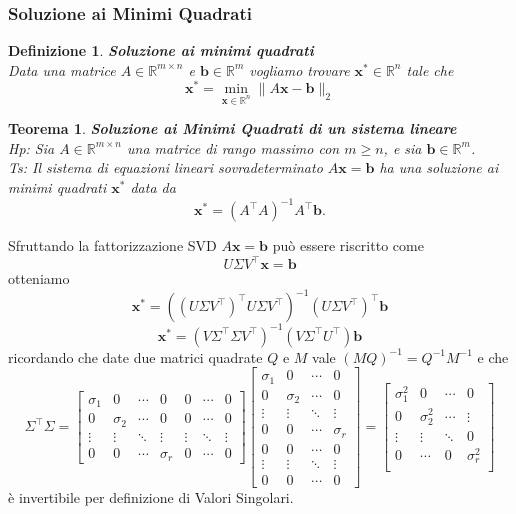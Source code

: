 \documentclass[11pt]{article}
\newtheorem{theorem}{Teorema}
\newtheorem{definition}{Definizione}
\newcommand{\R}{\mathbb{R}} %
\begin{document}
\subsubsection{Soluzione ai Minimi Quadrati}
\begin{definition}
\textbf{Soluzione ai minimi quadrati}\\
Data una matrice $A \in \R^{m \times n}$ e $ \mathbf{b} \in \R^m $  vogliamo trovare $\mathbf{x^*} \in \R^n$ tale che $$\mathbf{x^*} =	\min_{\mathbf{x} \in \R^{n}} \| A\mathbf{x} - \mathbf{b} \|_2 $$
\end{definition}
\begin{theorem}
\textbf{Soluzione ai Minimi Quadrati di un sistema lineare}\\
\textit{Hp:} Sia $A \in \mathbb{R}^{m \times n}$ una matrice di rango massimo con $m \geq n$, e sia $\mathbf{b} \in \mathbb{R}^m$.\\
\textit{Ts:} Il sistema di equazioni lineari sovradeterminato $A\mathbf{x} = \mathbf{b}$ ha una soluzione ai minimi quadrati $\mathbf{x}^*$ data da
\[
\mathbf{x}^* = (A^\top A)^{-1}A^\top \mathbf{b}.
\]
\end{theorem} \noindent 
Sfruttando la fattorizzazione SVD $A\mathbf{x} = \mathbf{b}$ può essere riscritto come
\[
U  \Sigma  V ^\top \mathbf{x} = \mathbf{b}
\]
otteniamo
\[
\mathbf{x}^* = ((U  \Sigma  V^\top )^\top U \Sigma V^\top)^{-1}(U \Sigma  V^\top )^\top \mathbf{b}
\]
\[
\mathbf{x}^* = ( V \Sigma^\top \Sigma V^\top)^{-1}(V \Sigma^\top U^\top)\mathbf{b}
\]
ricordando che date due matrici quadrate $Q$ e $M$ vale $(MQ)^{-1} = Q^{-1}M^{-1}$ e che 
$$
\Sigma^\top \Sigma = 
\begin{bmatrix}
\sigma_1 & 0 & \cdots & 0 & 0 & \cdots & 0 \\
0 & \sigma_2 & \cdots & 0 & 0 & \cdots & 0 \\
\vdots & \vdots & \ddots & \vdots & \vdots & \ddots & \vdots \\
0 & 0 & \cdots & \sigma_r & 0 & \cdots & 0
\end{bmatrix}
\begin{bmatrix}
\sigma_1 & 0 & \cdots & 0 \\
0 & \sigma_2 & \cdots & 0 \\
\vdots & \vdots & \ddots & \vdots \\
0 & 0 & \cdots & \sigma_r \\
0 & 0 & \cdots & 0 \\
\vdots & \vdots & \ddots & \vdots \\
0 & 0 & \cdots & 0
\end{bmatrix}
=
\begin{bmatrix}
\sigma_1^2 & 0 & \cdots & 0 \\
0 & \sigma_2^2 & \cdots & \vdots \\
\vdots & \vdots & \ddots & 0  \\
0 & \cdots & 0 & \sigma_r^2  \\
\end{bmatrix}
$$ è invertibile per definizione di Valori Singolari.\\
\end{document}
